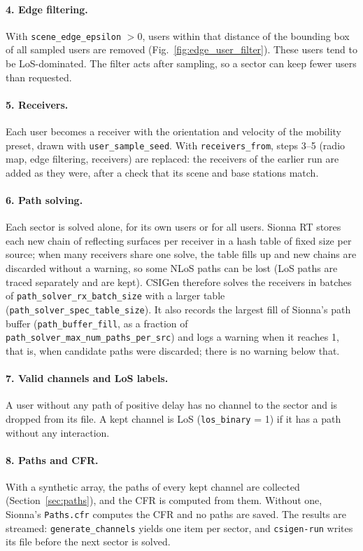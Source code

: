 \documentclass{article}
\newcommand{\key}[1]{\texttt{#1}}
\begin{document}
\paragraph{4. Edge filtering.} With \key{scene\_edge\_epsilon} $> 0$, users within that distance of the bounding box of all sampled users are removed (Fig.~\ref{fig:edge_user_filter}). These users tend to be LoS-dominated. The filter acts after sampling, so a sector can keep fewer users than requested.

\paragraph{5. Receivers.} Each user becomes a receiver with the orientation and velocity of the mobility preset, drawn with \key{user\_sample\_seed}. With \key{receivers\_from}, steps 3--5 (radio map, edge filtering, receivers) are replaced: the receivers of the earlier run are added as they were, after a check that its scene and base stations match.

\paragraph{6. Path solving.} Each sector is solved alone, for its own users or for all users. Sionna RT stores each new chain of reflecting surfaces per receiver in a hash table of fixed size per source; when many receivers share one solve, the table fills up and new chains are discarded without a warning, so some NLoS paths can be lost (LoS paths are traced separately and are kept). CSIGen therefore solves the receivers in batches of \key{path\_solver\_rx\_batch\_size} with a larger table (\key{path\_solver\_spec\_table\_size}). It also records the largest fill of Sionna's path buffer (\texttt{path\_buffer\_fill}, as a fraction of \key{path\_solver\_max\_num\_paths\_per\_src}) and logs a warning when it reaches 1, that is, when candidate paths were discarded; there is no warning below that.

\paragraph{7. Valid channels and LoS labels.} A user without any path of positive delay has no channel to the sector and is dropped from its file. A kept channel is LoS (\texttt{los\_binary} = 1) if it has a path without any interaction.

\paragraph{8. Paths and CFR.} With a synthetic array, the paths of every kept channel are collected (Section~\ref{sec:paths}), and the CFR is computed from them. Without one, Sionna's \texttt{Paths.cfr} computes the CFR and no paths are saved. The results are streamed: \texttt{generate\_channels} yields one item per sector, and \texttt{csigen-run} writes its file before the next sector is solved.
\end{document}
